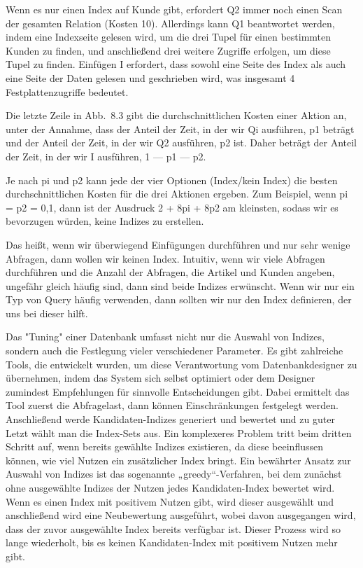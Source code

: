 Wenn es nur einen Index auf Kunde gibt, erfordert Q2 immer noch einen Scan der gesamten Relation (Kosten 10).
Allerdings kann Q1 beantwortet werden, indem eine Indexseite gelesen wird, um die drei Tupel für einen bestimmten Kunden zu finden, und anschließend drei weitere Zugriffe erfolgen, um diese Tupel zu finden.
Einfügen I erfordert, dass sowohl eine Seite des Index als auch eine Seite der Daten gelesen und geschrieben wird, was insgesamt 4 Festplattenzugriffe bedeutet.

Die letzte Zeile in Abb.\ 8.3 gibt die durchschnittlichen Kosten einer Aktion an, unter der Annahme, dass der Anteil der Zeit, in der wir Qi ausführen, p1 beträgt und der Anteil der Zeit, in der wir Q2 ausführen, p2 ist.
Daher beträgt der Anteil der Zeit, in der wir I ausführen, 1 — p1 — p2.

Je nach pi und p2 kann jede der vier Optionen (Index/kein Index) die besten durchschnittlichen Kosten für die drei Aktionen ergeben.
Zum Beispiel, wenn pi = p2 = 0,1, dann ist der Ausdruck 2 + 8pi + 8p2 am kleinsten, sodass wir es bevorzugen würden, keine Indizes zu erstellen.

Das heißt, wenn wir überwiegend Einfügungen durchführen und nur sehr wenige Abfragen, dann wollen wir keinen Index.
Intuitiv, wenn wir viele Abfragen durchführen und die Anzahl der Abfragen, die Artikel und Kunden angeben, ungefähr gleich häufig sind, dann sind beide Indizes erwünscht.
Wenn wir nur ein Typ von Query häufig verwenden, dann sollten wir nur den Index definieren, der uns bei dieser hilft.

Das "Tuning" einer Datenbank umfasst nicht nur die Auswahl von Indizes, sondern auch die Festlegung vieler verschiedener Parameter.
Es gibt zahlreiche Tools, die entwickelt wurden, um diese Verantwortung vom Datenbankdesigner zu übernehmen, indem das System sich selbst optimiert oder dem Designer zumindest Empfehlungen für sinnvolle Entscheidungen gibt.
Dabei ermittelt das Tool zuerst die Abfragelast, dann können Einschränkungen festgelegt werden.
Anschließend werde Kandidaten-Indizes generiert und bewertet und zu guter Letzt wählt man die Index-Sets aus.
Ein komplexeres Problem tritt beim dritten Schritt auf, wenn bereits gewählte Indizes existieren, da diese beeinflussen können, wie viel Nutzen ein zusätzlicher Index bringt.
Ein bewährter Ansatz zur Auswahl von Indizes ist das sogenannte „greedy“-Verfahren, bei dem zunächst ohne ausgewählte Indizes der Nutzen jedes Kandidaten-Index bewertet wird.
Wenn es einen Index mit positivem Nutzen gibt, wird dieser ausgewählt und anschließend wird eine Neubewertung ausgeführt, wobei davon ausgegangen wird, dass der zuvor ausgewählte Index bereits verfügbar ist.
Dieser Prozess wird so lange wiederholt, bis es keinen Kandidaten-Index mit positivem Nutzen mehr gibt.

